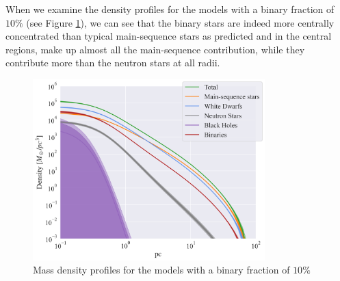 When we examine the density profiles for the models with a binary fraction of $10\%$ (see Figure
\ref{fig:highbin_model_densities}), we can see that the binary stars are indeed more centrally
concentrated than typical main-sequence stars as predicted and in the central regions, make up
almost all the main-sequence contribution, while they contribute more than the neutron stars at all
radii.



\begin{figure}
	\centering
	\includegraphics[width=0.8\textwidth]{figures/high_bin_model/density.png}
	\caption{Mass density profiles for the models with a binary fraction of $10\%$}
	\label{fig:highbin_model_densities}
\end{figure}

